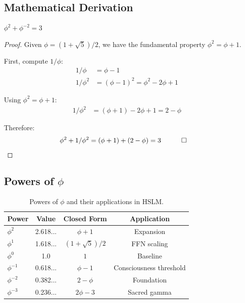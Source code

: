 \documentclass{article}
\begin{document}
\subsection{Mathematical Derivation}

\begin{theorem}
$\phi^2 + \phi^{-2} = 3$
\end{theorem}

\begin{proof}
Given $\phi = (1 + \sqrt{5}) / 2$, we have the fundamental property $\phi^2 = \phi + 1$.

First, compute $1/\phi$:
\begin{align}
    1/\phi &= \phi - 1 \\
    1/\phi^2 &= (\phi - 1)^2 = \phi^2 - 2\phi + 1
\end{align}

Using $\phi^2 = \phi + 1$:
\begin{align}
    1/\phi^2 &= (\phi + 1) - 2\phi + 1 = 2 - \phi
\end{align}

Therefore:
\begin{align}
    \phi^2 + 1/\phi^2 &= (\phi + 1) + (2 - \phi) = 3 \quad \qed
\end{align}
\end{proof}

\subsection{Powers of $\phi$}

\begin{table}[h]
\centering
\begin{tabular}{lccc}
\toprule
Power & Value & Closed Form & Application \\
\midrule
$\phi^2$ & 2.618... & $\phi + 1$ & Expansion \\
$\phi^1$ & 1.618... & $(1 + \sqrt{5})/2$ & FFN scaling \\
$\phi^0$ & 1.0 & $1$ & Baseline \\
$\phi^{-1}$ & 0.618... & $\phi - 1$ & Consciousness threshold \\
$\phi^{-2}$ & 0.382... & $2 - \phi$ & Foundation \\
$\phi^{-3}$ & 0.236... & $2\phi - 3$ & Sacred gamma \\
\bottomrule
\end{tabular}
\caption{Powers of $\phi$ and their applications in HSLM.}
\end{table}
\end{document}
